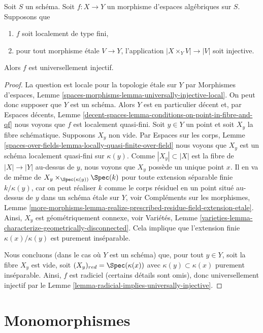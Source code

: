 \begin{lemma}
\label{lemma-check-universally-injective}
Soit $S$ un schéma. Soit $f : X \to Y$ un morphisme d'espaces
algébriques sur $S$. Supposons que
\begin{enumerate}
\item $f$ soit localement de type fini,
\item pour tout morphisme étale $V \to Y$, l'application $|X \times_Y V| \to |V|$
soit injective.
\end{enumerate}
Alors $f$ est universellement injectif.
\end{lemma}

\begin{proof}
La question est locale pour la topologie étale sur $Y$ par
Morphismes d'espaces, Lemme
\ref{spaces-morphisms-lemma-universally-injective-local}.
On peut donc supposer que $Y$ est un schéma.
Alors $Y$ est en particulier décent et, par Espaces décents, Lemme
\ref{decent-spaces-lemma-conditions-on-point-in-fibre-and-qf}
nous voyons que $f$ est localement quasi-fini.
Soit $y \in Y$ un point et soit $X_y$ la fibre schématique.
Supposons $X_y$ non vide. Par Espaces sur les corps, Lemme
\ref{spaces-over-fields-lemma-locally-quasi-finite-over-field}
nous voyons que $X_y$ est un schéma localement quasi-fini sur
$\kappa(y)$. Comme $|X_y| \subset |X|$ est la fibre de $|X| \to |Y|$
au-dessus de $y$, nous voyons que $X_y$ possède un unique point $x$. Il en va de même
de $X_y \times_{\Spec(\kappa(y))} \Spec(k)$ pour toute
extension séparable finie $k/\kappa(y)$,
car on peut réaliser $k$ comme le corps résiduel en un point
situé au-dessus de $y$ dans un schéma étale sur $Y$,
voir Compléments sur les morphismes, Lemme
\ref{more-morphisms-lemma-realize-prescribed-residue-field-extension-etale}.
Ainsi, $X_y$ est géométriquement connexe, voir
Variétés, Lemme \ref{varieties-lemma-characterize-geometrically-disconnected}.
Cela implique que l'extension finie $\kappa(x)/\kappa(y)$
est purement inséparable.

\medskip\noindent
Nous concluons (dans le cas où $Y$ est un schéma)
que, pour tout $y \in Y$, soit la fibre $X_y$ est vide,
soit $(X_y)_{red} = \Spec(\kappa(x))$ avec
$\kappa(y) \subset \kappa(x)$ purement inséparable.
Ainsi, $f$ est radiciel (certains détails sont omis), donc universellement injectif par le
Lemme \ref{lemma-radicial-implies-universally-injective}.
\end{proof}




\section{Monomorphismes}
\label{section-monomorphisms}

